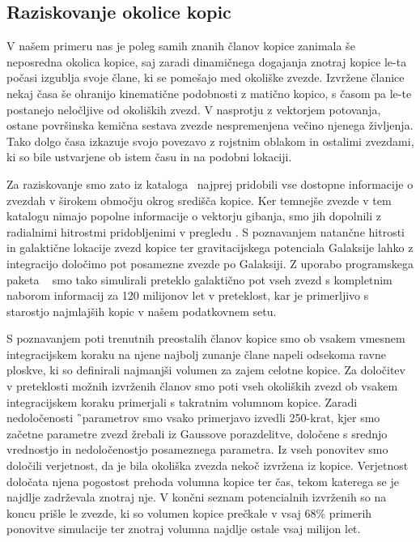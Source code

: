 \subsection{Raziskovanje okolice kopic}
V našem primeru nas je poleg samih znanih članov kopice zanimala še neposredna okolica kopice, saj zaradi dinamičnega dogajanja znotraj kopice le-ta počasi izgublja svoje člane, ki se pomešajo med okoliške zvezde. Izvržene članice nekaj časa še ohranijo kinematične podobnosti z matično kopico, s časom pa le-te postanejo neločljive od okoliških zvezd. V nasprotju z vektorjem potovanja, ostane površinska kemična sestava zvezde nespremenjena večino njenega življenja. Tako dolgo časa izkazuje svojo povezavo z rojstnim oblakom in ostalimi zvezdami, ki so bile ustvarjene ob istem času in na podobni lokaciji. 

Za raziskovanje smo zato iz kataloga \Gs\ najprej pridobili vse dostopne informacije o zvezdah v širokem območju okrog središča kopice. Ker temnejše zvezde v tem katalogu nimajo popolne informacije o vektorju gibanja, smo jih dopolnili z radialnimi hitrostmi pridobljenimi v pregledu \Gh. S poznavanjem natančne hitrosti in galaktične lokacije zvezd kopice ter gravitacijskega potenciala Galaksije lahko z integracijo določimo pot posamezne zvezde po Galaksiji. Z uporabo programskega paketa \GP\ \cite{2015ApJS..216...29B} smo tako simulirali preteklo galaktično pot vseh zvezd s kompletnim naborom informacij za 120 milijonov let v preteklost, kar je primerljivo s starostjo najmlajših kopic v našem podatkovnem setu.

S poznavanjem poti trenutnih preostalih članov kopice smo ob vsakem vmesnem integracijskem koraku na njene najbolj zunanje člane napeli odsekoma ravne ploskve, ki so definirali najmanjši volumen za zajem celotne kopice. Za določitev v preteklosti možnih izvrženih članov smo poti vseh okoliških zvezd ob vsakem integracijskem koraku primerjali s takratnim volumnom kopice. Zaradi nedoločenosti \G\ parametrov smo vsako primerjavo izvedli 250-krat, kjer smo začetne parametre zvezd žrebali iz Gaussove porazdelitve, določene s srednjo vrednostjo in nedoločenostjo posameznega parametra. Iz vseh ponovitev smo določili verjetnost, da je bila okoliška zvezda nekoč izvržena iz kopice. Verjetnost določata njena pogostost prehoda volumna kopice ter čas, tekom katerega se je najdlje zadrževala znotraj nje. V končni seznam potencialnih izvrženih so na koncu prišle le zvezde, ki so volumen kopice prečkale v vsaj $68$\% primerih ponovitve simulacije ter znotraj volumna najdlje ostale vsaj milijon let.

